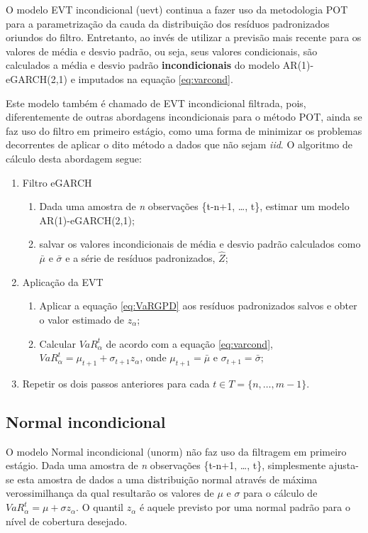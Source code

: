 \documentclass[1p]{elsarticle}
\theoremstyle{definition}
\begin{document}
O modelo EVT incondicional (uevt) continua a fazer uso da metodologia POT para a parametrização da cauda da  distribuição dos resíduos padronizados oriundos do filtro. Entretanto, ao invés de utilizar a previsão mais recente para os valores de média e desvio padrão, ou seja, seus valores condicionais, são calculados a média e desvio padrão \textbf{incondicionais} do modelo AR(1)-eGARCH(2,1) e imputados na equação \ref{eq:varcond}.

Este modelo também é chamado de EVT incondicional filtrada, pois, diferentemente de outras abordagens incondicionais para o método POT, ainda se faz uso do filtro em primeiro estágio, como uma forma de minimizar os problemas decorrentes de aplicar o dito método a dados que não sejam \emph{iid}. O algoritmo de cálculo desta abordagem segue:

\begin{enumerate}
	\item Filtro eGARCH
	\begin{enumerate}[label*=\arabic*.]
		\item Dada uma amostra de \emph{n} observações \{t-n+1, \ldots, t\}, estimar um modelo AR(1)-eGARCH(2,1);
		\item salvar os valores incondicionais de média e desvio padrão calculados como $\bar{\mu}$ e $\bar{\sigma}$ e a série de resíduos padronizados, $\hat{Z}$;
	\end{enumerate}
	
	\item Aplicação da EVT
	\begin{enumerate}[label*=\arabic*.]
		\item Aplicar a equação \eqref{eq:VaRGPD} aos resíduos padronizados salvos e obter o valor estimado de $z_\alpha$;
		\item Calcular $VaR^t_\alpha$ de acordo com a equação \eqref{eq:varcond}, $VaR_\alpha^t=\mu_{t+1}+\sigma_{t+1}z_\alpha$, onde $\mu_{t+1} = \bar{\mu}$ e $\sigma_{t+1} = \bar{\sigma}$;
	\end{enumerate}
	\item Repetir os dois passos anteriores para cada $t \in T = \{n, \ldots, m-1\}$.
\end{enumerate}

\subsection{Normal incondicional}

O modelo Normal incondicional (unorm) não faz uso da filtragem em primeiro estágio. Dada uma amostra de \emph{n} observações \{t-n+1, \ldots, t\}, simplesmente ajusta-se esta amostra de dados a uma distribuição normal através de máxima verossimilhança da qual resultarão os valores de $\mu$ e $\sigma$ para o cálculo de $VaR^t_\alpha=\mu+\sigma z_\alpha$. O quantil $z_\alpha$ é aquele previsto por uma normal padrão para o nível de cobertura desejado. 
\end{document}
